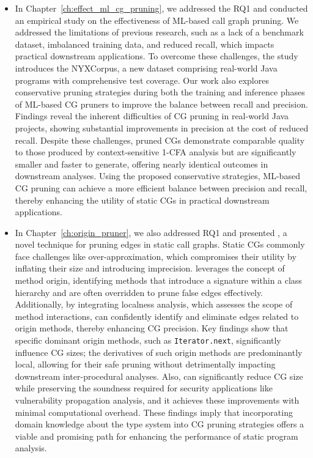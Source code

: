 \begin{itemize}
     \item In Chapter~\ref{ch:effect_ml_cg_pruning}, we addressed the RQ1 and conducted an empirical study on the effectiveness of ML-based call graph pruning. We addressed the limitations of previous research, such as a lack of a benchmark dataset, imbalanced training data, and reduced recall, which impacts practical downstream applications. To overcome these challenges, the study introduces the NYXCorpus, a new dataset comprising real-world Java programs with comprehensive test coverage. Our work also explores conservative pruning strategies during both the training and inference phases of ML-based CG pruners to improve the balance between recall and precision. Findings reveal the inherent difficulties of CG pruning in real-world Java projects, showing substantial improvements in precision at the cost of reduced recall. Despite these challenges, pruned CGs demonstrate comparable quality to those produced by context-sensitive 1-CFA analysis but are significantly smaller and faster to generate, offering nearly identical outcomes in downstream analyses. Using the proposed conservative strategies, ML-based CG pruning can achieve a more efficient balance between precision and recall, thereby enhancing the utility of static CGs in practical downstream applications.
    
    \item In Chapter~\ref{ch:origin_pruner}, we also addressed RQ1 and presented , a novel technique for pruning edges in static call graphs. Static CGs commonly face challenges like over-approximation, which compromises their utility by inflating their size and introducing imprecision.  leverages the concept of method origin, identifying methods that introduce a signature within a class hierarchy and are often overridden to prune false edges effectively. Additionally, by integrating localness analysis, which assesses the scope of method interactions,  can confidently identify and eliminate edges related to origin methods, thereby enhancing CG precision. Key findings show that specific dominant origin methods, such as \texttt{Iterator.next}, significantly influence CG sizes; the derivatives of such origin methods are predominantly local, allowing for their safe pruning without detrimentally impacting downstream inter-procedural analyses. Also,  can significantly reduce CG size while preserving the soundness required for security applications like vulnerability propagation analysis, and it achieves these improvements with minimal computational overhead. These findings imply that incorporating domain knowledge about the type system into CG pruning strategies offers a viable and promising path for enhancing the performance of static program analysis.
    

\end{itemize}
